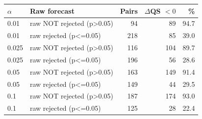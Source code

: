 \begin{tabular}{llrrr}
\toprule
$\alpha$ & Raw forecast & Pairs & $\Delta$QS $<0$ & \% \\
\midrule
0.01 & raw NOT rejected (p>0.05) & 94 & 89 & 94.7 \\
0.01 & raw rejected (p<=0.05) & 218 & 85 & 39.0 \\
0.025 & raw NOT rejected (p>0.05) & 116 & 104 & 89.7 \\
0.025 & raw rejected (p<=0.05) & 196 & 56 & 28.6 \\
0.05 & raw NOT rejected (p>0.05) & 163 & 149 & 91.4 \\
0.05 & raw rejected (p<=0.05) & 149 & 44 & 29.5 \\
0.1 & raw NOT rejected (p>0.05) & 187 & 174 & 93.0 \\
0.1 & raw rejected (p<=0.05) & 125 & 28 & 22.4 \\
\bottomrule
\end{tabular}
